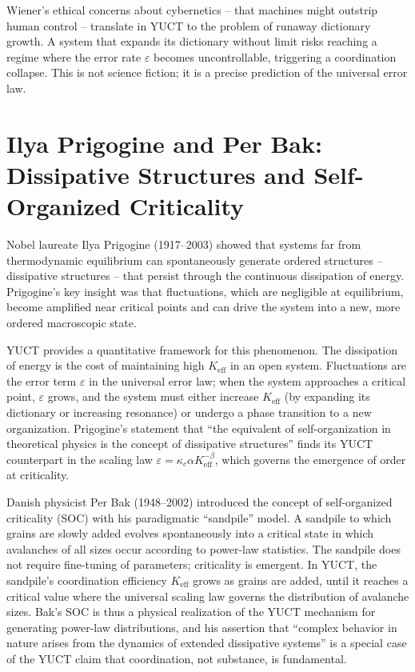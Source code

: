 \documentclass[12pt,a4paper]{article}
\begin{document}
	Wiener's ethical concerns about cybernetics -- that machines might outstrip human control -- translate in YUCT to the problem of runaway dictionary growth. A system that expands its dictionary without limit risks reaching a regime where the error rate \(\varepsilon\) becomes uncontrollable, triggering a coordination collapse. This is not science fiction; it is a precise prediction of the universal error law.
	
	\section{Ilya Prigogine and Per Bak: Dissipative Structures and Self-Organized Criticality}
	
	Nobel laureate Ilya Prigogine (1917–2003) showed that systems far from thermodynamic equilibrium can spontaneously generate ordered structures -- dissipative structures -- that persist through the continuous dissipation of energy. Prigogine's key insight was that fluctuations, which are negligible at equilibrium, become amplified near critical points and can drive the system into a new, more ordered macroscopic state.
	
	YUCT provides a quantitative framework for this phenomenon. The dissipation of energy is the cost of maintaining high \(K_{\mathrm{eff}}\) in an open system. Fluctuations are the error term \(\varepsilon\) in the universal error law; when the system approaches a critical point, \(\varepsilon\) grows, and the system must either increase \(K_{\mathrm{eff}}\) (by expanding its dictionary or increasing resonance) or undergo a phase transition to a new organization. Prigogine's statement that ``the equivalent of self-organization in theoretical physics is the concept of dissipative structures'' finds its YUCT counterpart in the scaling law \(\varepsilon = \kappa_c \alpha K_{\mathrm{eff}}^{-\beta}\), which governs the emergence of order at criticality.
	
	Danish physicist Per Bak (1948–2002) introduced the concept of self-organized criticality (SOC) with his paradigmatic ``sandpile'' model. A sandpile to which grains are slowly added evolves spontaneously into a critical state in which avalanches of all sizes occur according to power-law statistics. The sandpile does not require fine-tuning of parameters; criticality is emergent. In YUCT, the sandpile's coordination efficiency \(K_{\mathrm{eff}}\) grows as grains are added, until it reaches a critical value where the universal scaling law governs the distribution of avalanche sizes. Bak's SOC is thus a physical realization of the YUCT mechanism for generating power-law distributions, and his assertion that ``complex behavior in nature arises from the dynamics of extended dissipative systems'' is a special case of the YUCT claim that coordination, not substance, is fundamental.
	
\end{document}
